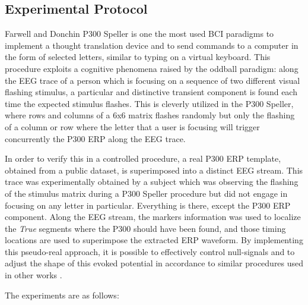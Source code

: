 \documentclass[brainsci,article,submit,moreauthors,pdftex,10pt,a4paper]{mdpi}
\begin{document}


\subsection{Experimental Protocol}
\label{Experimental}

Farwell and Donchin P300 Speller \citep{Farwell1988} is one the most used BCI paradigms to implement a thought translation device and to send commands to a computer in the form of selected letters, similar to typing on a virtual keyboard.  This procedure exploits a cognitive phenomena raised by the oddball paradigm: along the EEG trace of a person which is focusing on a sequence of two different visual flashing stimulus, a particular and distinctive transient component is found each time the expected stimulus flashes.  This is cleverly utilized in the P300 Speller, where rows and columns of a 6x6 matrix flashes randomly but only the flashing of a column or row where the letter that a user is focusing will trigger concurrently the P300 ERP along the EEG trace.

In order to verify this in a controlled procedure, a real P300 ERP template, obtained from a public dataset, is superimposed into a distinct EEG stream.  This trace was experimentally obtained by a subject which was observing the flashing of the stimulus matrix during a P300 Speller procedure but did not engage in focusing on any letter in particular. Everything is there, except the P300 ERP component. Along the EEG stream, the markers information was used to localize the \textit{True} segments where the P300 should have been found, and those timing locations are used to superimpose the extracted ERP waveform.  By implementing this pseudo-real approach, it is possible to effectively control null-signals and to adjust the shape of this evoked potential in accordance to similar procedures used in other works \citep{Ouyang2017,Jaskowski2000,QuianQuiroga2003}.

The experiments are as follows:
\end{document}
